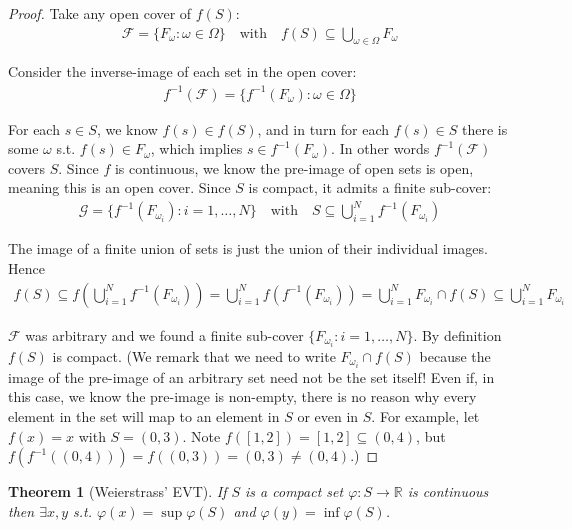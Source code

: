 \documentclass{article}
\theoremstyle{mythm}
\newtheorem{theorem}{Theorem}
\theoremstyle{mydef}
\begin{document}
\begin{proof}
  Take any open cover of $f(S)$:
  \begin{align*}
    \mathcal{F}
    =
    \{F_\omega: \omega \in \Omega\}
    \quad
    \text{with}
    \quad
    f(S)
    \subseteq
    \bigcup_{\omega \in \Omega}
    F_\omega
  \end{align*}

  Consider the inverse-image of each set in the open cover:
  \begin{align*}
    f^{-1}(\mathcal{F})
    =
    \{f^{-1}(F_\omega): \omega \in \Omega\}
  \end{align*}

  For each $s \in S$, we know $f(s) \in f(S)$, and in turn for each $f(s) \in S$ there is some $\omega$ s.t. $f(s) \in F_\omega$, which implies $s \in f^{-1}(F_\omega)$. In other words $f^{-1}(\mathcal{F})$ covers $S$. Since $f$ is continuous, we know the pre-image of open sets is open, meaning this is an open cover. Since $S$ is compact, it admits a finite sub-cover:
  \begin{align*}
    \mathcal{G}
    =
    \{f^{-1}(F_{\omega_i}): i = 1, \ldots, N\}
    \quad
    \text{with}
    \quad
    S
    \subseteq
    \bigcup_{i = 1}^N
    f^{-1}(F_{\omega_i})
  \end{align*}

  The image of a finite union of sets is just the union of their individual images. Hence
  \begin{align*}
    f(S)
    \subseteq
    f\left(
      \bigcup_{i = 1}^N
      f^{-1}(F_{\omega_i})
    \right)
    =
    \bigcup_{i = 1}^N
    f\left(
      f^{-1}(F_{\omega_i})
    \right)
    =
    \bigcup_{i = 1}^N
    F_{\omega_i} \cap f(S)
    \subseteq
    \bigcup_{i = 1}^N
    F_{\omega_i}
  \end{align*}

  $\mathcal{F}$ was arbitrary and we found a finite sub-cover $\{F_{\omega_i}: i = 1, \ldots, N\}$. By definition $f(S)$ is compact. (We remark that we need to write $F_{\omega_i} \cap f(S)$ because the image of the pre-image of an arbitrary set need not be the set itself! Even if, in this case, we know the pre-image is non-empty, there is no reason why every element in the set will map to an element in $S$ or even in $S$. For example, let $f(x) = x$ with $S = (0, 3)$. Note $f([1, 2]) = [1, 2] \subseteq (0, 4)$, but $f(f^{-1}((0, 4))) = f((0, 3)) = (0, 3) \ne (0, 4)$.)
\end{proof}

\begin{theorem}[Weierstrass' EVT]\label{thm:lecture3_continuity_weierstrass_evt}
  If $S$ is a compact set $\varphi: S \to \mathbb{R}$ is continuous then $\exists x, y$ s.t. $\varphi(x) = \sup \varphi(S)$ and $\varphi(y) = \inf \varphi(S)$.
\end{theorem}
\end{document}
